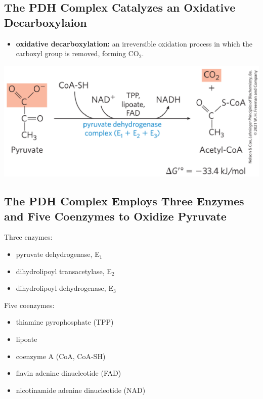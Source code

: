 \documentclass[10pt]{article}
\begin{document}
\subsection*{The PDH Complex Catalyzes an Oxidative Decarboxylaion}
\begin{itemize}
	\item \textbf{oxidative decarboxylation:} an irreversible oxidation process in which the carboxyl group is removed, forming CO$_2$.
\end{itemize}
\begin{center} 
	\includegraphics*[width=\textwidth]{L3_10.png}
\end{center}

\subsection*{The PDH Complex Employs Three Enzymes and Five Coenzymes to Oxidize Pyruvate}
Three enzymes:
\begin{itemize}
	\item pyruvate dehydrogenase, E$_1$
	\item dihydrolipoyl transacetylase, E$_2$
	\item dihydrolipoyl dehydrogenase, E$_3$
\end{itemize}
Five coenzymes:
\begin{itemize}
	\item thiamine pyrophosphate (TPP)
	\item lipoate
	\item coenzyme A (CoA, CoA-SH)
	\item flavin adenine dinucleotide (FAD)
	\item nicotinamide adenine dinucleotide (NAD)
\end{itemize}
\end{document}
